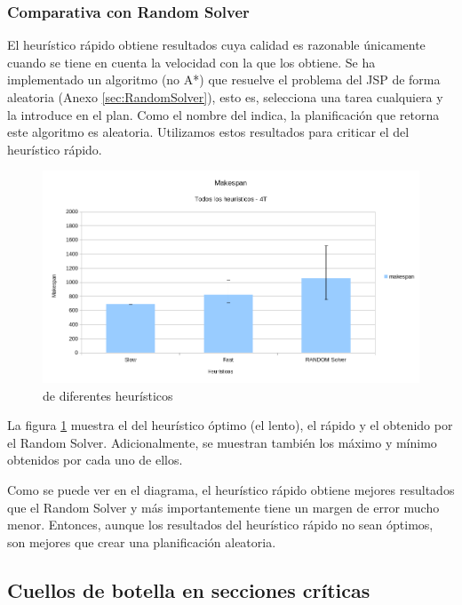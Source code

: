 \subsubsection{Comparativa con Random Solver}

El heurístico rápido obtiene resultados cuya calidad es razonable
únicamente cuando se tiene en cuenta la velocidad con la que
los obtiene.
Se ha implementado un algoritmo (no A*) que resuelve
el problema del JSP de forma aleatoria (Anexo \ref{sec:RandomSolver}),
esto es, selecciona una tarea cualquiera y la introduce en el plan.
Como el nombre del  indica, la planificación
que retorna este algoritmo es aleatoria.
Utilizamos estos resultados para criticar el 
del heurístico rápido.

\begin{figure}[h]
    \centering
    \includegraphics[width=\textwidth]{Media/Ch2/Makespan_Random_Solver.png}
    \caption{ de diferentes heurísticos}
    \label{fig:MakespanRandomSolver}
\end{figure}

La figura \ref{fig:MakespanRandomSolver} muestra el 
del heurístico óptimo (el lento), el rápido y el obtenido
por el Random Solver.
Adicionalmente, se muestran también los 
máximo y mínimo obtenidos por cada uno de ellos.

Como se puede ver en el diagrama, el heurístico rápido obtiene mejores
resultados que el Random Solver y más importantemente tiene un
margen de error mucho menor.
Entonces, aunque los resultados del heurístico rápido no
sean óptimos, son mejores que crear una planificación aleatoria.

\subsection{Cuellos de botella en secciones críticas}


